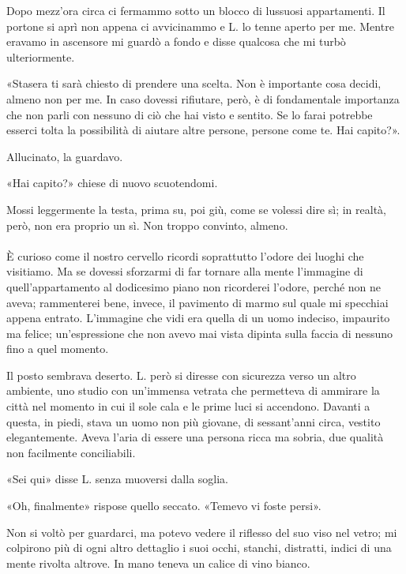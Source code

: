 \documentclass[a4paper,12pt]{book}
\begin{document}
Dopo mezz'ora circa ci fermammo sotto un blocco di lussuosi appartamenti. Il
portone si aprì non appena ci avvicinammo e L. lo tenne aperto per me. Mentre
eravamo in ascensore mi guardò a fondo e disse qualcosa che mi turbò
ulteriormente.

«Stasera ti sarà chiesto di prendere una scelta. Non è importante cosa
decidi, almeno non per me. In caso dovessi rifiutare, però, è di fondamentale
importanza che non parli con nessuno di ciò che hai visto e sentito. Se lo farai
potrebbe esserci tolta la possibilità di aiutare altre persone, persone come te.
Hai capito?».

Allucinato, la guardavo.

«Hai capito?» chiese di nuovo scuotendomi.

Mossi leggermente la testa, prima su, poi giù, come se volessi dire sì; in
realtà, però, non era proprio un sì. Non troppo convinto, almeno.

\paragraph{}
È curioso come il nostro cervello ricordi soprattutto l'odore dei luoghi che
visitiamo. Ma se dovessi sforzarmi di far tornare alla mente l'immagine di
quell'appartamento al dodicesimo piano non ricorderei l'odore, perché non ne
aveva; rammenterei bene, invece, il pavimento di marmo sul quale mi specchiai
appena entrato. L'immagine che vidi era quella di un uomo indeciso, impaurito ma
felice; un'espressione che non avevo mai vista dipinta sulla faccia di nessuno
fino a quel momento.

Il posto sembrava deserto. L. però si diresse con sicurezza verso un altro
ambiente, uno studio con un'immensa vetrata che permetteva di ammirare la
città nel momento in cui il sole cala e le prime luci si accendono. Davanti a
questa, in piedi, stava un uomo non più giovane, di sessant'anni circa, vestito
elegantemente. Aveva l'aria di essere una persona ricca ma sobria, due qualità
non facilmente conciliabili.

«Sei qui» disse L. senza muoversi dalla soglia.

«Oh, finalmente» rispose quello seccato. «Temevo vi foste persi».

Non si voltò per guardarci, ma potevo vedere il riflesso del suo viso nel vetro;
mi colpirono più di ogni altro dettaglio i suoi occhi, stanchi, distratti,
indici di una mente rivolta altrove. In mano teneva un calice di vino bianco.
\end{document}
